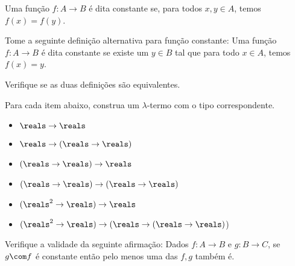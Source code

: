 \begin{definition}
Uma função $f : A \to B$ é dita constante se, para todos $x,y \in A$, temos $f(x) = f(y)$.
\end{definition}

\begin{exercise}
Tome a seguinte definição alternativa para função constante:
Uma função $f : A \to B$ é dita constante se existe um $y \in B$ tal que para todo $x \in A$, temos $f(x) = y$.

Verifique se as duas definições são equivalentes.
\end{exercise}

\begin{exercise}
Para cada item abaixo, construa um $\lambda$-termo com o tipo correspondente.
\begin{itemize}
    \item $\reals \to \reals$
    \item $\reals \to (\reals \to \reals)$
    \item $(\reals \to \reals) \to \reals$
    \item $(\reals \to \reals) \to (\reals \to \reals)$
    \item $(\reals^2 \to \reals) \to \reals$
    \item $(\reals^2 \to \reals) \to (\reals \to (\reals \to \reals)$)
\end{itemize}
\end{exercise}

\begin{exercise}
Verifique a validade da seguinte afirmação:
Dados $f : A \to B$ e $g : B \to C$, se $g \com f$ é constante então pelo menos uma das $f,g$ também é.
\end{exercise}
